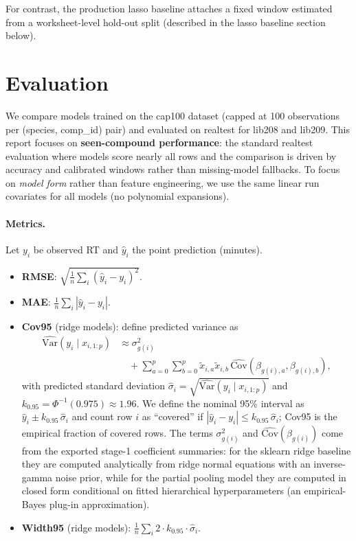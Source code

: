 \documentclass[11pt]{article}
\begin{document}
For contrast, the production lasso baseline attaches a fixed window estimated from a worksheet-level hold-out split
(described in the lasso baseline section below).

\section{Evaluation}

We compare models trained on the cap100 dataset (capped at 100 observations per (species, comp\_id) pair) and
evaluated on realtest for lib208 and lib209. This report focuses on
\textbf{seen-compound performance}: the standard realtest evaluation where models score nearly all rows and the
comparison is driven by accuracy and calibrated windows rather than missing-model fallbacks.
To focus on \emph{model form} rather than feature engineering, we use the same linear run covariates for all models
(no polynomial expansions).

\paragraph{Metrics.}
Let $y_i$ be observed RT and $\hat{y}_i$ the point prediction (minutes).
\begin{itemize}
  \item \textbf{RMSE}: $\sqrt{\frac{1}{n}\sum_i (\hat{y}_i - y_i)^2}$.
  \item \textbf{MAE}: $\frac{1}{n}\sum_i |\hat{y}_i - y_i|$.
  \item \textbf{Cov95} (ridge models): define predicted variance as
  \[
  \begin{aligned}
    \widehat{\mathrm{Var}}(y_i\mid x_{i,1:p})
    &\approx \sigma^2_{g(i)} \\
    &\quad + \sum_{a=0}^{p}\sum_{b=0}^{p}
      \tilde{x}_{i,a}\tilde{x}_{i,b}\,
      \widehat{\mathrm{Cov}}\!\left(\beta_{g(i),a},\beta_{g(i),b}\right),
  \end{aligned}
  \]
  with predicted standard deviation $\hat{\sigma}_i=\sqrt{\widehat{\mathrm{Var}}(y_i\mid x_{i,1:p})}$ and
  $k_{0.95}=\Phi^{-1}(0.975)\approx 1.96$.
  We define the nominal 95\% interval as $\hat{y}_i \pm k_{0.95}\,\hat{\sigma}_i$ and count row $i$ as ``covered'' if
  $|\hat{y}_i - y_i| \le k_{0.95}\,\hat{\sigma}_i$; Cov95 is the empirical fraction of covered rows.
  The terms $\sigma^2_{g(i)}$ and $\widehat{\mathrm{Cov}}(\beta_{g(i)})$ come from the exported stage-1 coefficient summaries:
  for the sklearn ridge baseline they are computed analytically from ridge normal equations with an inverse-gamma noise prior,
  while for the partial pooling model they are computed in closed form conditional on fitted hierarchical hyperparameters
  (an empirical-Bayes plug-in approximation).
  \item \textbf{Width95} (ridge models): $\frac{1}{n}\sum_i 2\cdot k_{0.95}\cdot \hat{\sigma}_i$.
\end{itemize}
\end{document}

